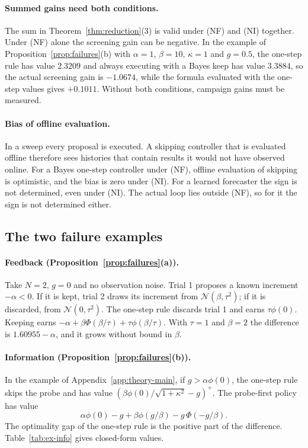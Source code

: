 \paragraph{Summed gains need both conditions.}
The sum in Theorem~\ref{thm:reduction}(3) is valid under (NF) and (NI) together. Under (NF) alone the screening gain can be negative. In the example of Proposition~\ref{prop:failures}(b) with $\alpha=1$, $\beta=10$, $\kappa=1$ and $g=0.5$, the one-step rule has value $2.3209$ and always executing with a Bayes keep has value $3.3884$, so the actual screening gain is $-1.0674$, while the formula evaluated with the one-step values gives $+0.1011$. Without both conditions, campaign gains must be measured.

\paragraph{Bias of offline evaluation.}
In a sweep every proposal is executed. A skipping controller that is evaluated offline therefore sees histories that contain results it would not have observed online. For a Bayes one-step controller under (NF), offline evaluation of skipping is optimistic, and the bias is zero under (NI). For a learned forecaster the sign is not determined, even under (NI). The actual loop lies outside (NF), so for it the sign is not determined either.

\subsection{The two failure examples}

\paragraph{Feedback (Proposition~\ref{prop:failures}(a)).}
Take $N=2$, $g=0$ and no observation noise. Trial 1 proposes a known increment $-\alpha<0$. If it is kept, trial 2 draws its increment from $\mathcal{N}(\beta,\tau^2)$; if it is discarded, from $\mathcal{N}(0,\tau^2)$. The one-step rule discards trial 1 and earns $\tau\phi(0)$. Keeping earns $-\alpha+\beta\Phi(\beta/\tau)+\tau\phi(\beta/\tau)$. With $\tau=1$ and $\beta=2$ the difference is $1.60955-\alpha$, and it grows without bound in $\beta$.

\paragraph{Information (Proposition~\ref{prop:failures}(b)).}
In the example of Appendix~\ref{app:theory-main}, if $g>\alpha\phi(0)$, the one-step rule skips the probe and has value $(\beta\phi(0)/\sqrt{1+\kappa^2}-g)^+$. The probe-first policy has value
\[
\alpha\phi(0)-g+\beta\phi(g/\beta)-g\,\Phi(-g/\beta).
\]
The optimality gap of the one-step rule is the positive part of the difference. Table~\ref{tab:ex-info} gives closed-form values.


